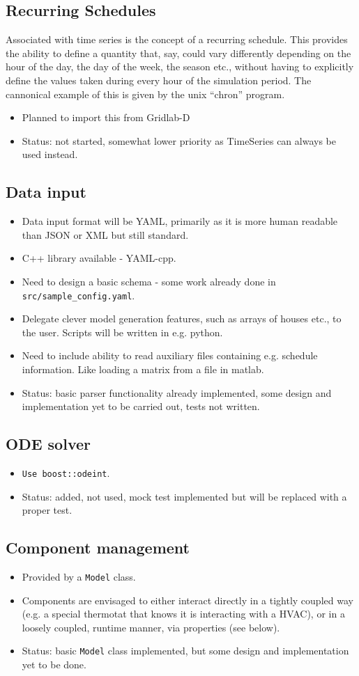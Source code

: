 \documentclass[12pt]{article}
\newcommand{\itm}[1]{\begin{itemize}#1\end{itemize}}
\begin{document}
\subsection{Recurring Schedules}
Associated with time series is the concept of a recurring schedule. This provides the ability to define a quantity that, say, could vary differently depending on the hour of the day, the day of the week, the season etc., without having to explicitly define the values taken during every hour of the simulation period. The cannonical example of this is given by the unix ``chron'' program.
\itm {
	\item Planned to import this from Gridlab-D
	\item Status: not started, somewhat lower priority as TimeSeries can always be used instead.
}

\subsection{Data input}
\itm{
	\item Data input format will be YAML, primarily as it is more human readable than JSON or XML but still standard.
	\item C++ library available - YAML-cpp.
	\item Need to design a basic schema - some work already done in \texttt{src/sample\_config.yaml}.
	\item Delegate clever model generation features, such as arrays of houses etc., to the user. Scripts will be written in e.g. python.
	\item Need to include ability to read auxiliary files containing e.g. schedule information. Like loading a matrix from a file in matlab.
	\item Status: basic parser functionality already implemented, some design and implementation yet to be carried out, tests not written.
}

\subsection{ODE solver}
\itm{
	\item \texttt{Use boost::odeint}.
	\item Status: added, not used, mock test implemented but will be replaced with a proper test.
}

\subsection{Component management}
\itm{
	\item Provided by a \texttt{Model} class.
	\item Components are envisaged to either interact directly in a tightly coupled way (e.g. a special thermotat that knows it is interacting with a HVAC), or in a loosely coupled, runtime manner, via properties (see below).
	\item Status: basic \texttt{Model} class implemented, but some design and implementation yet to be done.
}
\end{document}
